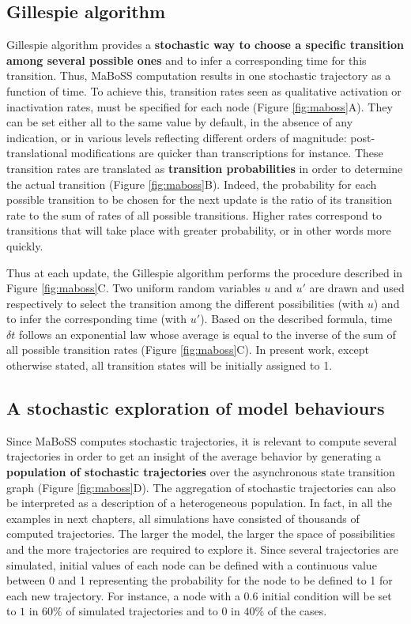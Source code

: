 \documentclass[a4paper,12pt,twoside,onecolumn,openright,final,oldfontcommands]{memoir}
\begin{document}
\subsection{Gillespie algorithm}\label{gillespie-algorithm}

Gillespie algorithm provides a \textbf{stochastic way to choose a
specific transition among several possible ones} and to infer a
corresponding time for this transition. Thus, MaBoSS computation results
in one stochastic trajectory as a function of time. To achieve this,
transition rates seen as qualitative activation or inactivation rates,
must be specified for each node (Figure \ref{fig:maboss}A). They can be
set either all to the same value by default, in the absence of any
indication, or in various levels reflecting different orders of
magnitude: post-translational modifications are quicker than
transcriptions for instance. These transition rates are translated as
\textbf{transition probabilities} in order to determine the actual
transition (Figure \ref{fig:maboss}B). Indeed, the probability for each
possible transition to be chosen for the next update is the ratio of its
transition rate to the sum of rates of all possible transitions. Higher
rates correspond to transitions that will take place with greater
probability, or in other words more quickly.

Thus at each update, the Gillespie algorithm performs the procedure
described in Figure \ref{fig:maboss}C. Two uniform random variables
\(u\) and \(u'\) are drawn and used respectively to select the
transition among the different possibilities (with \(u\)) and to infer
the corresponding time (with \(u'\)). Based on the described formula,
time \(\delta t\) follows an exponential law whose average is equal to
the inverse of the sum of all possible transition rates (Figure
\ref{fig:maboss}C). In present work, except otherwise stated, all
transition states will be initially assigned to 1.

\subsection{A stochastic exploration of model
behaviours}\label{a-stochastic-exploration-of-model-behaviours}

Since MaBoSS computes stochastic trajectories, it is relevant to compute
several trajectories in order to get an insight of the average behavior
by generating a \textbf{population of stochastic trajectories} over the
asynchronous state transition graph (Figure \ref{fig:maboss}D). The
aggregation of stochastic trajectories can also be interpreted as a
description of a heterogeneous population. In fact, in all the examples
in next chapters, all simulations have consisted of thousands of
computed trajectories. The larger the model, the larger the space of
possibilities and the more trajectories are required to explore it.
Since several trajectories are simulated, initial values of each node
can be defined with a continuous value between 0 and 1 representing the
probability for the node to be defined to 1 for each new trajectory. For
instance, a node with a \(0.6\) initial condition will be set to \(1\)
in \(60\%\) of simulated trajectories and to \(0\) in \(40\%\) of the
cases.
\end{document}
